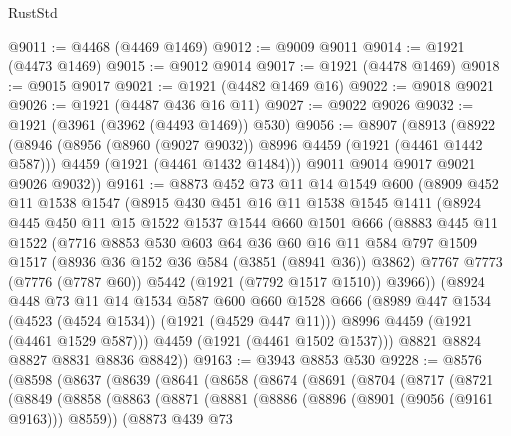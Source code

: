 \begin{lexlean}{RustStd}
\begin{coremodule}
@9011 := @4468 (@4469 @1469)
@9012 := @9009 @9011
@9014 := @1921 (@4473 @1469)
@9015 := @9012 @9014
@9017 := @1921 (@4478 @1469)
@9018 := @9015 @9017
@9021 := @1921 (@4482 @1469 @16)
@9022 := @9018 @9021
@9026 := @1921 (@4487 @436 @16 @11)
@9027 := @9022 @9026
@9032 := @1921 (@3961 (@3962 (@4493 @1469)) @530)
@9056 := @8907
    (@8913
      (@8922
        (@8946
          (@8956 (@8960 (@9027 @9032)) @8996 @4459 (@1921 (@4461 @1442 @587)))
          @4459
          (@1921 (@4461 @1432 @1484)))
        @9011
        @9014
        @9017
        @9021
        @9026
        @9032))
@9161 := @8873
    @452
    @73
    @11
    @14
    @1549
    @600
    (@8909
      @452
      @11
      @1538
      @1547
      (@8915
        @430
        @451
        @16
        @11
        @1538
        @1545
        @1411
        (@8924
          @445
          @450
          @11
          @15
          @1522
          @1537
          @1544
          @660
          @1501
          @666
          (@8883
            @445
            @11
            @1522
            (@7716
              @8853
              @530
              @603
              @64
              @36
              @60
              @16
              @11
              @584
              @797
              @1509
              @1517
              (@8936 @36 @152 @36 @584 (@3851 (@8941 @36)) @3862)
              @7767
              @7773
              (@7776 (@7787 @60))
              @5442
              (@1921 (@7792 @1517 @1510))
              @3966))
          (@8924
            @448
            @73
            @11
            @14
            @1534
            @587
            @600
            @660
            @1528
            @666
            (@8989 @447 @1534 (@4523 (@4524 @1534)) (@1921 (@4529 @447 @11)))
            @8996
            @4459
            (@1921 (@4461 @1529 @587)))
          @4459
          (@1921 (@4461 @1502 @1537)))
        @8821
        @8824
        @8827
        @8831
        @8836
        @8842))
@9163 := @3943 @8853 @530
@9228 := @8576
    (@8598
      (@8637
        (@8639
          (@8641
            (@8658
              (@8674
                (@8691
                  (@8704
                    (@8717
                      (@8721
                        (@8849
                          (@8858
                            (@8863
                              (@8871
                                (@8881
                                  (@8886 (@8896 (@8901 (@9056 (@9161 @9163))) @8559))
                                  (@8873
                                    @439
                                    @73

\end{coremodule}
\end{lexlean}
